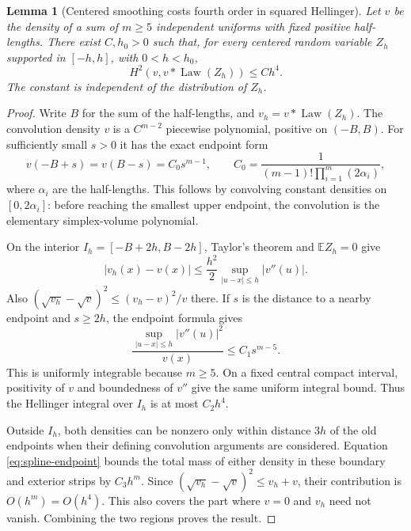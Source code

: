 \documentclass[11pt,a4paper]{article}
\numberwithin{equation}{section}
\newtheorem{lemma}[theorem]{Lemma}
\theoremstyle{definition}
\theoremstyle{remark}
\DeclareMathOperator{\Law}{Law}
\newcommand{\E}{\mathbb E}
\begin{document}
\begin{lemma}[Centered smoothing costs fourth order in squared Hellinger]
\label{lem:hellinger-smoothing}
Let $v$ be the density of a sum of $m\ge5$ independent uniforms with fixed
positive half-lengths. There exist $C,h_0>0$ such that, for every centered
random variable $Z_h$ supported in $[-h,h]$, with $0<h<h_0$,
\begin{equation}
 H^2(v,v*\Law(Z_h))\le Ch^4.
 \label{eq:hellinger-smoothing}
\end{equation}
The constant is independent of the distribution of $Z_h$.
\end{lemma}
\begin{proof}
Write $B$ for the sum of the half-lengths, and $v_h=v*\Law(Z_h)$.
The convolution density $v$ is a $C^{m-2}$ piecewise polynomial, positive
on $(-B,B)$. For sufficiently small $s>0$ it has the exact endpoint form
\begin{equation}
 v(-B+s)=v(B-s)=C_0s^{m-1},
 \qquad
 C_0=\frac{1}{(m-1)!\prod_{i=1}^m(2\alpha_i)},
 \label{eq:spline-endpoint}
\end{equation}
where $\alpha_i$ are the half-lengths. This follows by convolving constant
densities on $[0,2\alpha_i]$: before reaching the smallest upper endpoint,
the convolution is the elementary simplex-volume polynomial.

On the interior $I_h=[-B+2h,B-2h]$, Taylor's theorem and $\E Z_h=0$ give
\begin{equation}
 |v_h(x)-v(x)|\le\frac{h^2}{2}
               \sup_{|u-x|\le h}|v''(u)|.
 \label{eq:smoothing-taylor}
\end{equation}
Also $(\sqrt{v_h}-\sqrt v)^2\le(v_h-v)^2/v$ there.
If $s$ is the distance to a nearby endpoint and $s\ge2h$, the endpoint
formula gives
\[
 \frac{\sup_{|u-x|\le h}|v''(u)|^2}{v(x)}
 \le C_1s^{m-5}.
\]
This is uniformly integrable because $m\ge5$. On a fixed central compact
interval, positivity of $v$ and boundedness of $v''$ give the same uniform
integral bound. Thus the Hellinger integral over $I_h$ is at most $C_2h^4$.

Outside $I_h$, both densities can be nonzero only within distance $3h$
of the old endpoints when their defining convolution arguments are considered.
Equation \eqref{eq:spline-endpoint} bounds the total mass of either density
in these boundary and exterior strips by $C_3h^m$. Since
$(\sqrt{v_h}-\sqrt v)^2\le v_h+v$, their contribution is
$O(h^m)=O(h^4)$. This also covers the part where $v=0$ and $v_h$ need
not vanish. Combining the two regions proves the result.
\end{proof}
\end{document}

